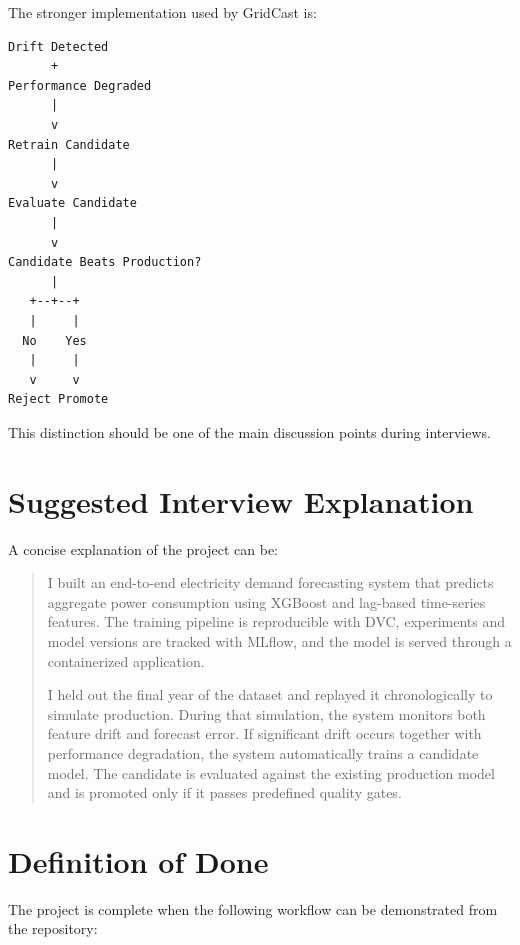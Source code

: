 \documentclass[11pt,a4paper]{article}
\newcommand{\projectname}{GridCast}
\begin{document}
The stronger implementation used by \projectname{} is:

\begin{verbatim}
Drift Detected
      +
Performance Degraded
      |
      v
Retrain Candidate
      |
      v
Evaluate Candidate
      |
      v
Candidate Beats Production?
      |
   +--+--+
   |     |
  No    Yes
   |     |
   v     v
Reject Promote
\end{verbatim}

This distinction should be one of the main discussion points during interviews.

\section{Suggested Interview Explanation}

A concise explanation of the project can be:

\begin{quote}
I built an end-to-end electricity demand forecasting system that predicts aggregate power consumption using XGBoost and lag-based time-series features. The training pipeline is reproducible with DVC, experiments and model versions are tracked with MLflow, and the model is served through a containerized application.

I held out the final year of the dataset and replayed it chronologically to simulate production. During that simulation, the system monitors both feature drift and forecast error. If significant drift occurs together with performance degradation, the system automatically trains a candidate model. The candidate is evaluated against the existing production model and is promoted only if it passes predefined quality gates.
\end{quote}

\section{Definition of Done}

The project is complete when the following workflow can be demonstrated from the repository:
\end{document}
